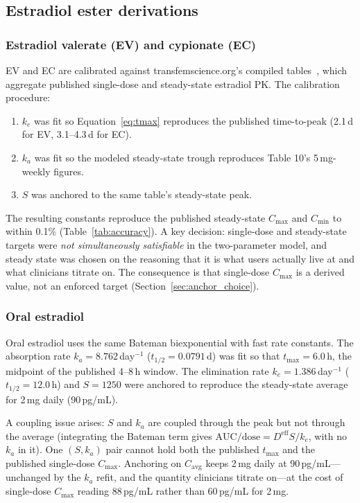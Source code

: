 \documentclass[11pt,a4paper]{article}
\begin{document}
\subsection{Estradiol ester derivations}
\label{sec:e2}

\subsubsection{Estradiol valerate (EV) and cypionate (EC)}

EV and EC are calibrated against transfemscience.org's compiled
tables~\cite{tfs}, which aggregate published single-dose and
steady-state estradiol PK. The calibration procedure:
\begin{enumerate}[nosep,leftmargin=1.4em]
\item $k_e$ was fit so Equation~\ref{eq:tmax} reproduces the published
  time-to-peak (2.1\,d for EV, 3.1--4.3\,d for EC).
\item $k_a$ was fit so the modeled steady-state trough reproduces
  Table 10's 5\,mg-weekly figures.
\item $S$ was anchored to the same table's steady-state peak.
\end{enumerate}

The resulting constants reproduce the published steady-state $C_{\max}$
and $C_{\min}$ to within 0.1\% (Table~\ref{tab:accuracy}). A key
decision: single-dose and steady-state targets were \emph{not
simultaneously satisfiable} in the two-parameter model, and steady state
was chosen on the reasoning that it is what users actually live at and
what clinicians titrate on. The consequence is that single-dose
$C_{\max}$ is a derived value, not an enforced target
(Section~\ref{sec:anchor_choice}).

\subsubsection{Oral estradiol}

Oral estradiol uses the same Bateman biexponential with fast rate
constants. The absorption rate $k_a = 8.762$\,day$^{-1}$
($t_{1/2} = 0.0791$\,d) was fit so that $t_{\max} = 6.0$\,h, the
midpoint of the published 4--8\,h window. The elimination rate $k_e =
1.386$\,day$^{-1}$ ($t_{1/2} = 12.0$\,h) and $S = 1250$ were anchored to
reproduce the steady-state average for 2\,mg daily (90\,pg/mL).

A coupling issue arises: $S$ and $k_a$ are coupled through the peak but
not through the average (integrating the Bateman term gives
$\mathrm{AUC}/\text{dose} = D^{\mathrm{eff}} S / k_e$, with no $k_a$ in
it). One $(S, k_a)$ pair cannot hold both the published $t_{\max}$ and
the published single-dose $C_{\max}$. Anchoring on $C_{\mathrm{avg}}$
keeps 2\,mg daily at 90\,pg/mL---unchanged by the $k_a$ refit, and the
quantity clinicians titrate on---at the cost of single-dose $C_{\max}$
reading 88\,pg/mL rather than 60\,pg/mL for 2\,mg.
\end{document}
